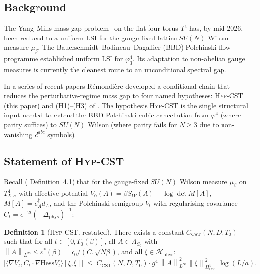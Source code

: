 \documentclass[11pt,a4paper]{amsart}
\theoremstyle{definition}
\newtheorem{definition}[theorem]{Definition}
\newcommand{\norm}[1]{\left\lVert#1\right\rVert}
\newcommand{\Coul}{\mathrm{Coul}}
\newcommand{\Hess}{\mathrm{Hess}}
\newcommand{\HypCST}{\textsc{Hyp-CST}}
\begin{document}
\subsection{Background}

The Yang--Mills mass gap problem~\cite{JaffeWitten2000} on the flat
four-torus $T^4$ has, by mid-2026, been reduced to a uniform LSI for
the gauge-fixed lattice $SU(N)$ Wilson measure $\mu_\beta$. The
Bauerschmidt--Bodineau--Dagallier (BBD) Polchinski-flow programme
\cite{BauerschmidtBodineauDagallier2024,BauerschmidtDagallier2024}
established uniform LSI for $\varphi^4_3$. Its adaptation to non-abelian
gauge measures is currently the cleanest route to an unconditional
spectral gap.

In a series of recent papers \cite{RemondiereKRFP3_2026,
RemondiereKRFPBakryEmery_2026, RemondiereFPHess_2026,
RemondiereClosure2026} R\'emondi\`ere developed a conditional chain
that reduces the perturbative-regime mass gap to four named
hypotheses: \HypCST{} (this paper) and (H1)--(H3) of
\cite{RemondiereKRFP3_2026}. The hypothesis \HypCST{} is the single
structural input needed to extend the BBD Polchinski-cubic
cancellation from $\varphi^4$ (where parity suffices) to $SU(N)$
Wilson (where parity fails for $N\geq 3$ due to non-vanishing
$d^{abc}$ symbols).

\subsection{Statement of \HypCST{}}

Recall (\cite{RemondiereClosure2026} Definition~4.1) that for the
gauge-fixed $SU(N)$ Wilson measure $\mu_\beta$ on $T^4_{L,a}$ with
effective potential $V_0(A) = \beta S_W(A) - \log\det M[A]$,
$M[A] = d_A^\dagger d_A$, and the Polchinski semigroup
$V_t$ with regularising covariance $C_t = e^{-2t}(-\Delta_{\mathrm{phys}})^{-1}$:

\begin{definition}[\HypCST{}, restated]\label{def:HypCST}
There exists a constant $C_{\mathrm{CST}}(N, D, T_0)$ such that for all
$t \in [0, T_0(\beta)]$, all $A \in \overline\Lambda_{S_0}$ with
$\norm{A}_{L^\infty} \leq \varepsilon^*(\beta) = c_0/(C_1\sqrt{N\beta})$,
and all $\xi \in \mathcal H_{\mathrm{phys}}$:
\[
\bigl|\langle \nabla V_t, C_t \cdot \nabla \Hess V_t\rangle [\xi, \xi]\bigr|
\;\leq\; C_{\mathrm{CST}}(N, D, T_0) \cdot g^4\, \norm{A}^2_{L^\infty}\, \norm{\xi}^2_{H^1_{\Coul}}\, \log(L/a).
\]
\end{definition}
\end{document}
